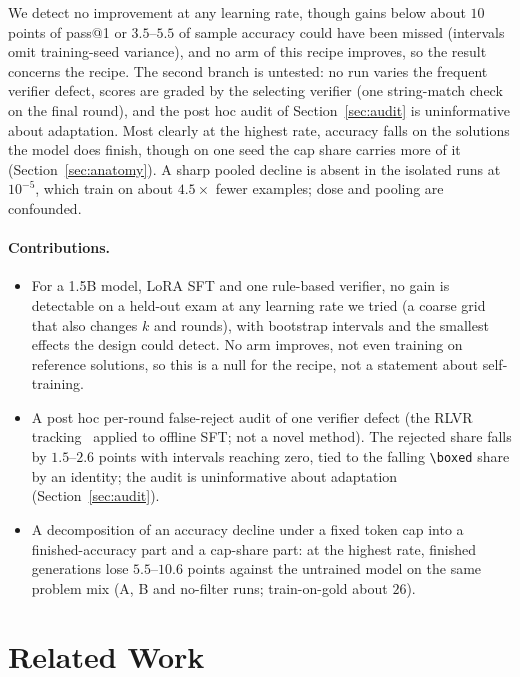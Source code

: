 \documentclass[runningheads]{llncs}
\begin{document}
We detect no improvement at any learning rate, though gains below about $10$
points of pass@1 or $3.5$--$5.5$ of sample accuracy could have been missed
(intervals omit training-seed variance), and no arm of this recipe improves, so the result concerns
the recipe. The second branch is untested: no run varies the frequent verifier defect, scores are
graded by the selecting verifier (one string-match check on the final round), and the post hoc audit of
Section~\ref{sec:audit} is uninformative about adaptation. Most clearly at the highest rate, accuracy falls on the solutions the model
does finish, though on one seed the cap share carries more of it (Section~\ref{sec:anatomy}). A sharp pooled decline is absent in the isolated runs at $10^{-5}$, which train on about $4.5\times$ fewer examples; dose and pooling are confounded.

\paragraph{Contributions.}
\begin{itemize}
\item For a 1.5B model, LoRA SFT and one rule-based verifier, no gain is
detectable on a held-out exam at any learning rate we tried (a coarse grid that also changes $k$ and rounds), with
bootstrap intervals and the smallest effects the design could detect. No arm
improves, not even training on reference solutions, so this is a null for the
recipe, not a statement about self-training.
\item A post hoc per-round false-reject audit of one verifier defect (the RLVR
tracking~\cite{ref_delayplateau,ref_tinyv} applied to offline SFT; not a novel method). The rejected
share falls by $1.5$--$2.6$ points with intervals reaching zero, tied to the falling \verb|\boxed| share by
an identity; the audit is uninformative about adaptation (Section~\ref{sec:audit}).
\item A decomposition of an accuracy decline under a fixed token cap into a
finished-accuracy part and a cap-share part: at the highest rate, finished
generations lose $5.5$--$10.6$ points against the untrained model on the same
problem mix (A, B and no-filter runs; train-on-gold about $26$).
\end{itemize}

\section{Related Work}
\label{sec:related}
\end{document}
